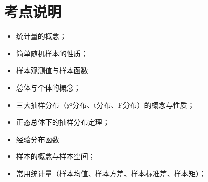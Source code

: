 \section{考点说明}
\begin{itemize}
\item 统计量的概念；
\item 简单随机样本的性质；
\item 样本观测值与样本函数
\item 总体与个体的概念；
\item 三大抽样分布（χ²分布、t分布、F分布）的概念与性质；
\item 正态总体下的抽样分布定理；
\item 经验分布函数
\item 样本的概念与样本空间；
\item 常用统计量（样本均值、样本方差、样本标准差、样本矩）；
\end{itemize}

